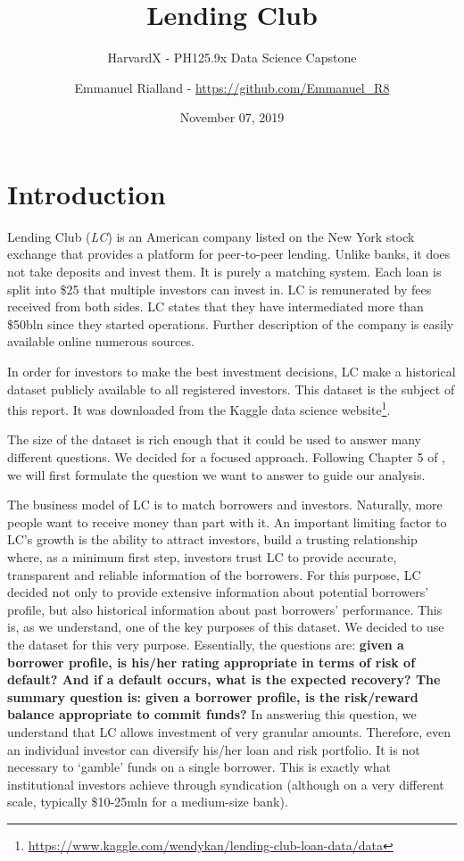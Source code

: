 \documentclass[11pt,]{report}
\title{Lending Club}
\subtitle{HarvardX - PH125.9x Data Science Capstone}
\author{Emmanuel Rialland - \url{https://github.com/Emmanuel_R8}}
\date{November 07, 2019}
\let\rmarkdownfootnote\footnote%
\def\footnote{\protect\rmarkdownfootnote}
\begin{document}
\maketitle

{
\hypersetup{linkcolor=black}
\setcounter{tocdepth}{2}
\tableofcontents
}
\listoftables
\listoffigures
\small

\normalsize

\hypertarget{introduction}{%
\chapter*{Introduction}\label{introduction}}

Lending Club (\emph{LC}) is an American company listed on the New York stock exchange that provides a platform for peer-to-peer lending. Unlike banks, it does not take deposits and invest them. It is purely a matching system. Each loan is split into \$25 that multiple investors can invest in. LC is remunerated by fees received from both sides. LC states that they have intermediated more than \$50bln since they started operations. Further description of the company is easily available online numerous sources.

In order for investors to make the best investment decisions, LC make a historical dataset publicly available to all registered investors. This dataset is the subject of this report. It was downloaded from the Kaggle data science website\footnote{\url{https://www.kaggle.com/wendykan/lending-club-loan-data/data}}.

The size of the dataset is rich enough that it could be used to answer many different questions. We decided for a focused approach. Following Chapter 5 of \citep{peng2012exploratory}, we will first formulate the question we want to answer to guide our analysis.

The business model of LC is to match borrowers and investors. Naturally, more people want to receive money than part with it. An important limiting factor to LC's growth is the ability to attract investors, build a trusting relationship where, as a minimum first step, investors trust LC to provide accurate, transparent and reliable information of the borrowers. For this purpose, LC decided not only to provide extensive information about potential borrowers' profile, but also historical information about past borrowers' performance. This is, as we understand, one of the key purposes of this dataset. We decided to use the dataset for this very purpose. Essentially, the questions are: \textbf{given a borrower profile, is his/her rating appropriate in terms of risk of default? And if a default occurs, what is the expected recovery? The summary question is: given a borrower profile, is the risk/reward balance appropriate to commit funds?} In answering this question, we understand that LC allows investment of very granular amounts. Therefore, even an individual investor can diversify his/her loan and risk portfolio. It is not necessary to `gamble' funds on a single borrower. This is exactly what institutional investors achieve through syndication (although on a very different scale, typically \$10-25mln for a medium-size bank).
\end{document}
